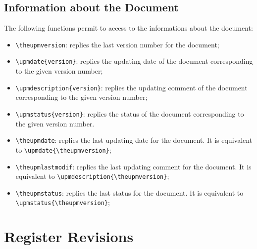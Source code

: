 \documentclass[book,taskpackage,specpackage,codepackage]{upmethodology-document}
\begin{document}
\subsection{Information about the Document}

The following functions permit to access to the informations about the document:
\begin{itemize}
\item \texttt{{\textbackslash}theupmversion}: replies the last version number for the document;

\item \texttt{{\textbackslash}upmdate\{version\}}: replies the updating date of the document corresponding to the given version number;

\item \texttt{{\textbackslash}upmdescription\{version\}}: replies the updating comment of the document corresponding to the given version number;

\item \texttt{{\textbackslash}upmstatus\{version\}}: replies the status of the document corresponding to the given version number.

\item \texttt{{\textbackslash}theupmdate}: replies the last updating date for the document. It is equivalent to \texttt{{\textbackslash}upmdate\{{\textbackslash}theupmversion\}};

\item \texttt{{\textbackslash}theupmlastmodif}: replies the last updating comment for the document. It is equivalent to \texttt{{\textbackslash}upmdescription\{{\textbackslash}theupmversion\}};

\item \texttt{{\textbackslash}theupmstatus}: replies the last status for the document. It is equivalent to \texttt{{\textbackslash}upmstatus\{{\textbackslash}theupmversion\}};
\end{itemize}

\section{Register Revisions}
\end{document}
